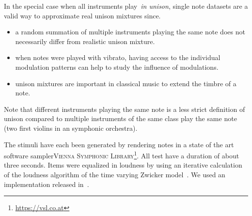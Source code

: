 
In the special case when all instruments play~\emph{in unison}, single note datasets are a valid way to approximate real unison mixtures since.

\begin{itemize}
  \item a random summation of multiple instruments playing the same note does not necessarily differ from realistic unison mixture.
  \item when notes were played with vibrato, having access to the individual modulation patterns can help to study the influence of modulations.
  \item unison mixtures are important in classical music to extend the timbre of a note.
\end{itemize}

Note that different instruments playing the same note is a less strict definition of unison compared to multiple instruments of the same class play the same note (two first violins in an symphonic orchestra).

\par
The stimuli have each been generated by rendering notes in a state of the art software sampler\textsc{Vienna Symphonic Library}\footnote{\url{https://vsl.co.at}}. All test have a duration of about three seconds. Items were equalized in loudness by using an iterative calculation of the loudness algorithm of the time varying Zwicker model~\cite{zwicker13}. 
We used an implementation released in~\cite{genesis12}. 

